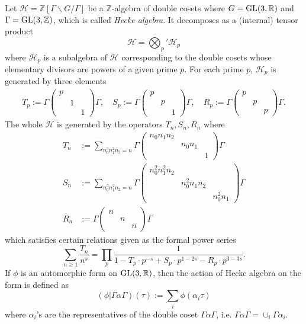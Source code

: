 \begin{definition}
Let $\mathcal{H} = \mathbb{Z}[\Gamma \backslash G / \Gamma]$ be a $\mathbb{Z}$-algebra of double cosets where $G = \operatorname{\mathrm{GL}}(3, \mathbb{R})$ and $\Gamma = \operatorname{\mathrm{GL}}(3, \mathbb{Z})$, which is called \emph{Hecke algebra}.
It decomposes as a (internal) tensor product
$$
\mathcal{H} = \bigotimes_{p}' \mathcal{H}_{p}
$$
where $\mathcal{H}_{p}$ is a subalgebra of $\mathcal{H}$ corresponding to the double cosets whose elementary divisors are powers of a given prime $p$.
For each prime $p$, $\mathcal{H}_{p}$ is generated by three elements
\begin{align*}
    T_{p} := \Gamma \begin{pmatrix}
    p & & \\ & 1 & \\ & & 1
    \end{pmatrix} \Gamma, \quad
    S_{p} := \Gamma \begin{pmatrix}
    p & & \\ & p & \\ & & 1
    \end{pmatrix} \Gamma, \quad
    R_{p} := \Gamma \begin{pmatrix}
    p & & \\ & p & \\ & & p
    \end{pmatrix} \Gamma.
\end{align*}
The whole $\mathcal{H}$ is generated by the operators $T_{n}, S_{n}, R_{n}$ where 
\begin{align*}
    T_{n} &:= \sum_{n_{0}^{3} n_{1}^{2} n_{2} = n} \Gamma \begin{pmatrix}
    n_{0}n_{1}n_{2} & & \\ & n_{0}n_{1} & \\ & & 1
    \end{pmatrix} \Gamma \\
    S_{n} &:= \sum_{n_{0}^{3} n_{1}^{2} n_{2} = n} \Gamma \begin{pmatrix}
    n_{0}^{2}n_{1}^{2}n_{2} & & \\ & n_{0}^{2}n_{1}n_{2} & \\ & & n_{0}^{2}n_{1}
    \end{pmatrix} \Gamma \\
    R_{n} &:= \Gamma \begin{pmatrix}
    n & & \\ & n & \\ & & n
    \end{pmatrix} \Gamma
\end{align*}
which satisfies certain relations given as the formal power series
$$
\sum_{n \geq 1} \frac{T_{n}}{n^{s}} = \prod_{p} \frac{1}{1 - T_{p}\cdot p^{-s} +S_{p}\cdot p^{1-2s} - R_{p}\cdot p^{3-3s}}.
$$
If $\phi$ is an automorphic form on $\operatorname{\mathrm{GL}}(3, \mathbb{R})$, then the action of Hecke algebra on the form is defined as 
$$
(\phi | \Gamma \alpha \Gamma)(\tau) := \sum_{i} \phi(\alpha_{i} \tau)
$$
where $\alpha_{i}$'s are the representatives of the double coset $\Gamma \alpha \Gamma$, i.e. $\Gamma \alpha \Gamma = \cup_{i} \Gamma\alpha_{i}$.
\end{definition}
